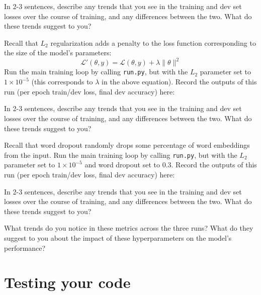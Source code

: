\documentclass[11pt]{article}
\begin{document}
\vspace{4em}

\noindent In 2-3 sentences, describe any trends that you see in the training and dev set losses over the course of training, and any differences between the two.  What do these trends suggest to you?


\vspace{2em}
 Recall that $L_2$ regularization adds a penalty to the loss function corresponding to the size of the model's parameters:
\[ \mathcal{L}'(\theta, y) = \mathcal{L}(\theta, y) + \lambda \|\theta\|^2 \]
Run the main training loop by calling \texttt{run.py}, but with the $L_2$ parameter set to $1\times10^{-5}$ (this corresponds to $\lambda$ in the above equation).  Record the outputs of this run (per epoch train/dev loss, final dev accuracy) here:

\vspace{4em}

\noindent In 2-3 sentences, describe any trends that you see in the training and dev set losses over the course of training, and any differences between the two.  What do these trends suggest to you?


\vspace{2em}
 Recall that word dropout randomly drops some percentage of word embeddings from the input.
Run the main training loop by calling \texttt{run.py}, but with the $L_2$ parameter set to $1\times10^{-5}$ and word dropout set to $0.3$.  Record the outputs of this run (per epoch train/dev loss, final dev accuracy) here:

\vspace{4em}

\noindent In 2-3 sentences, describe any trends that you see in the training and dev set losses over the course of training, and any differences between the two.  What do these trends suggest to you?


\vspace{2em}
 What trends do you notice in these metrics across the three runs?  What do they suggest to you about the impact of these hyperparameters on the model's performance?



\section{Testing your code}
\end{document}
